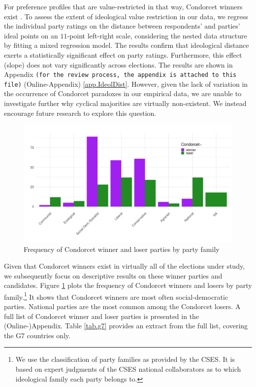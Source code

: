 \documentclass[12pt]{scrartcl}
\begin{document}
For preference profiles that are value-restricted in that way, Condorcet winners exist \citep{Black1958, Sen1966}. To assess the extent of ideological value restriction in our data, we regress the individual party  ratings on the distance between respondents' and parties' ideal points on an $11$-point left-right scale, considering the nested data structure by fitting a mixed regression model. The results confirm that ideological distance exerts a statistically significant effect on party ratings. Furthermore, this effect (slope) does not vary significantly across elections. The results are shown in Appendix \texttt{(for the review process, the appendix is attached to this file)} (Online-Appendix) \ref{app.IdeolDist}. However, given the lack of variation in the occurrence of Condorcet paradoxes in our empirical data, we are unable to investigate further why cyclical majorities are virtually non-existent. We instead encourage future research to explore this question.

\begin{figure}
	\centering
\includegraphics[width=\linewidth]{barplotFAM}
\caption{Frequency of Condorcet winner and loser parties by party family \label{f1}}
\end{figure}

Given that Condorcet winners exist in virtually all of the elections under study, we subsequently focus on descriptive results on these winner parties and candidates. Figure \ref{f1} plots the frequency of Condorcet winners and losers by party family.\footnote{
  We use the classification of party families as provided by the CSES. It is based on expert judgments of the CSES national collaborators as to which ideological family each party belongs to. 
} It shows that Condorcet winners are most often social-democratic parties. National parties are the most common among the Condorcet losers. A full list of Condorcet winner and loser parties is presented in the (Online-)Appendix. Table \ref{tab.g7} provides an extract from the full list, covering the G7 countries only.
\end{document}
